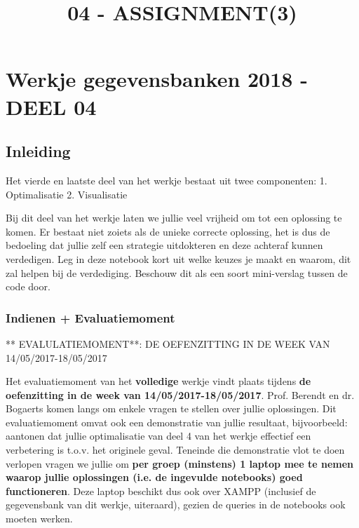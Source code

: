 \documentclass[11pt]{article}
\title{04 - ASSIGNMENT(3)}
\begin{document}
    
    
    \maketitle
    
    

    
    \section{Werkje gegevensbanken 2018 - DEEL
04}\label{werkje-gegevensbanken-2018---deel-04}

\subsection{Inleiding}\label{inleiding}

Het vierde en laatste deel van het werkje bestaat uit twee componenten:
1. Optimalisatie 2. Visualisatie

Bij dit deel van het werkje laten we jullie veel vrijheid om tot een
oplossing te komen. Er bestaat niet zoiets als de unieke correcte
oplossing, het is dus de bedoeling dat jullie zelf een strategie
uitdokteren en deze achteraf kunnen verdedigen. Leg in deze notebook
kort uit welke keuzes je maakt en waarom, dit zal helpen bij de
verdediging. Beschouw dit als een soort mini-verslag tussen de code
door.

\subsubsection{Indienen +
Evaluatiemoment}\label{indienen-evaluatiemoment}

** EVALULATIEMOMENT**: DE OEFENZITTING IN DE WEEK VAN
14/05/2017-18/05/2017

Het evaluatiemoment van het \textbf{volledige} werkje vindt plaats
tijdens \textbf{de oefenzitting in de week van 14/05/2017-18/05/2017}.
Prof. Berendt en dr. Bogaerts komen langs om enkele vragen te stellen
over jullie oplossingen. Dit evaluatiemoment omvat ook een demonstratie
van jullie resultaat, bijvoorbeeld: aantonen dat jullie optimalisatie
van deel 4 van het werkje effectief een verbetering is t.o.v. het
originele geval. Teneinde die demonstratie vlot te doen verlopen vragen
we jullie om \textbf{per groep (minstens) 1 laptop mee te nemen waarop
jullie oplossingen (i.e. de ingevulde notebooks) goed functioneren}.
Deze laptop beschikt dus ook over XAMPP (inclusief de gegevensbank van
dit werkje, uiteraard), gezien de queries in de notebooks ook moeten
werken.
\end{document}
